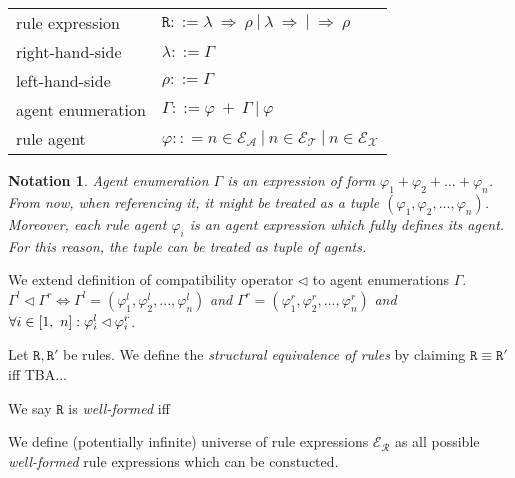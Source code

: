 \documentclass{entcs}
\renewcommand{\~}[0]{\texttildelow}
\newcommand{\choice}{|}
\newtheorem{notation}[thm]{Notation}
\begin{document}
\begin{center}
{\small
\hspace*{-1cm}\begin{tabular}{ l l }
 rule expression & $\mathtt{R} ::= \lambda ~\Rightarrow~ \rho ~|~ \lambda ~\Rightarrow ~|~ \Rightarrow~ \rho $\\
 right-hand-side & $\lambda ::= \Gamma$\\
 left-hand-side & $\rho ::= \Gamma$\\
 agent enumeration & $\Gamma ::= \varphi~ +~\Gamma ~|~ \varphi$\\
 rule agent & $\varphi :: = n \in \mathcal{E}_\mathcal{A}~\choice~n \in \mathcal{E}_\mathcal{T}~\choice~n \in \mathcal{E}_\mathcal{X}$\\
\end{tabular}
}
\end{center}

\begin{notation} \label{mynote}
Agent enumeration $\Gamma$ is an expression of form $\varphi_1 + \varphi_2 + ... + \varphi_n$. From now, when referencing it, it might be treated as a tuple $(\varphi_1, \varphi_2, ..., \varphi_n)$. Moreover, each rule agent $\varphi_i$ is an agent expression which fully defines its agent. For this reason, the tuple can be treated as tuple of agents. 
\end{notation} 

\begin{defn}
We extend definition of compatibility operator $\lhd$ to agent enumerations $\Gamma$. $\Gamma^{l} \lhd \Gamma^{r} \Leftrightarrow \Gamma^{l} = (\varphi^{l}_1, \varphi^{l}_2, ..., \varphi^{l}_n)$ \emph{and} $\Gamma^{r} = (\varphi^{r}_1, \varphi^{r}_2, ..., \varphi^{r}_n)$ \emph{and} $\\ \forall i \in [1,~n] : \varphi^{l}_i \lhd \varphi^{r}_i $.
\end{defn}

\begin{defn}
Let $\mathtt{R},\mathtt{R}'$ be rules. We define the \emph{structural equivalence of rules} by claiming $\mathtt{R} \equiv \mathtt{R}'$ iff TBA...
\end{defn}

\begin{defn}
We say $\mathtt{R}$ is \emph{well-formed} iff
\end{defn}

\begin{theorem}
We define (potentially infinite) universe of rule expressions $\mathcal{E}_\mathcal{R} $ as all possible \emph{well-formed} rule expressions which can be constucted.
\end{theorem}
\end{document}
